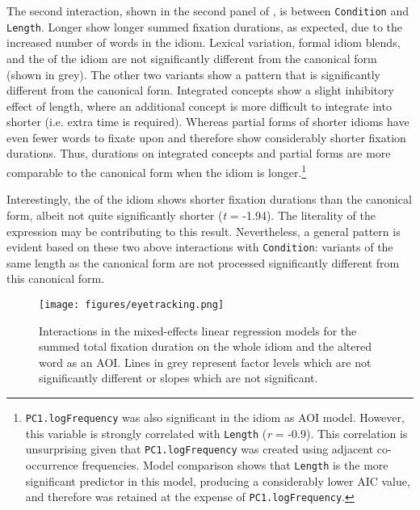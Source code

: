 \documentclass[output=paper
,modfonts
,nonflat]{langsci/langscibook}
\begin{document}
The second interaction, shown in the second panel of , is between \texttt{Condition} and \texttt{Length}. Longer  show longer summed fixation durations, as expected, due to the increased number of words in the idiom. Lexical  variation, formal idiom  blends, and the  of the idiom are not significantly different from the canonical form (shown in grey). The other two variants  show a pattern that is significantly different from the canonical form. Integrated concepts show a slight inhibitory effect of length, where an additional concept is more difficult to integrate into shorter  (i.e. extra time is required). Whereas partial forms of shorter idioms have even fewer words to fixate upon and therefore show considerably shorter fixation durations. Thus, durations on integrated concepts  and partial forms  are more comparable to the canonical form when the idiom is longer.\footnote{\texttt{PC1.logFrequency} was also significant in the idiom as AOI model. However, this variable is strongly correlated with \texttt{Length} (\textit{r} = -0.9). This correlation is unsurprising given that \texttt{PC1.logFrequency} was created using adjacent co-occurrence frequencies. Model comparison shows that \texttt{Length} is the more significant predictor in this model, producing a considerably lower AIC value, and therefore was retained at the expense of \texttt{PC1.logFrequency}.} 

Interestingly, the  of the idiom shows shorter fixation durations than the canonical form, albeit not quite significantly shorter (\textit{t} = -1.94). The literality of the expression \citep{TitoneConnine1994b} may be contributing to this result. Nevertheless, a general pattern is evident based on these two above interactions with \texttt{Condition}: variants of the same length as the canonical form are not processed significantly different from this canonical form.


\begin{figure}
\centering
\texttt{[image: figures/eyetracking.png]}
\caption{Interactions in the mixed-effects linear regression models for the summed total fixation duration on the whole idiom and the altered word as an AOI. Lines in grey represent factor levels which are not significantly different or slopes which are not significant.}
\label{plotEyetracking}
\end{figure}
\end{document}
